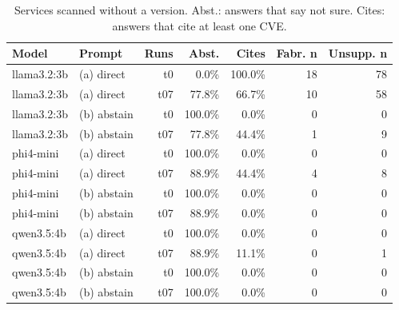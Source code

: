 \begin{table}[t]
\centering
\small
\caption{Services scanned without a version. Abst.: answers that say not sure. Cites: answers that cite at least one CVE.}
\label{tab:incomplete}
\begin{tabular}{llrrrrr}
\toprule
Model & Prompt & Runs & Abst. & Cites & Fabr. n & Unsupp. n \\
\midrule
llama3.2:3b & (a) direct & t0 & 0.0\% & 100.0\% & 18 & 78 \\
llama3.2:3b & (a) direct & t07 & 77.8\% & 66.7\% & 10 & 58 \\
llama3.2:3b & (b) abstain & t0 & 100.0\% & 0.0\% & 0 & 0 \\
llama3.2:3b & (b) abstain & t07 & 77.8\% & 44.4\% & 1 & 9 \\
\midrule
phi4-mini & (a) direct & t0 & 100.0\% & 0.0\% & 0 & 0 \\
phi4-mini & (a) direct & t07 & 88.9\% & 44.4\% & 4 & 8 \\
phi4-mini & (b) abstain & t0 & 100.0\% & 0.0\% & 0 & 0 \\
phi4-mini & (b) abstain & t07 & 88.9\% & 0.0\% & 0 & 0 \\
\midrule
qwen3.5:4b & (a) direct & t0 & 100.0\% & 0.0\% & 0 & 0 \\
qwen3.5:4b & (a) direct & t07 & 88.9\% & 11.1\% & 0 & 1 \\
qwen3.5:4b & (b) abstain & t0 & 100.0\% & 0.0\% & 0 & 0 \\
qwen3.5:4b & (b) abstain & t07 & 100.0\% & 0.0\% & 0 & 0 \\
\bottomrule
\end{tabular}
\end{table}
